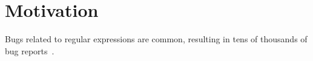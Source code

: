 \section{Motivation}

Bugs related to regular expressions are common, resulting in tens of thousands of bug reports~\cite{Spishak:2012:TSR:2318202.2318207}. 